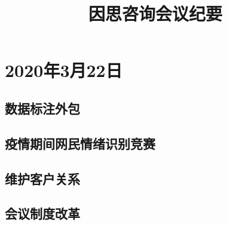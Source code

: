 \documentclass[UTF8]{ctexart}
\begin{document}
\title{\textbf{因思咨询会议纪要}}
\author{}
\date{\vspace{-10ex}}
\maketitle

\section{2020年3月22日}

\subsection{数据标注外包}

\subsection{疫情期间网民情绪识别竞赛}

\subsection{维护客户关系}

\subsection{会议制度改革}
\end{document}
